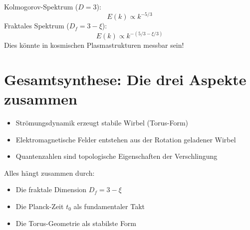 \documentclass[12pt,a4paper]{article}
\begin{document}
	Kolmogorov-Spektrum (\( D = 3 \)):
	\[
	E(k) \propto k^{-5/3}
	\]
	Fraktales Spektrum (\( D_f = 3 - \xi \)):
	\[
	E(k) \propto k^{-(5/3 - \xi/3)}
	\]
	Dies könnte in kosmischen Plasmastrukturen messbar sein!
	
	\section{Gesamtsynthese: Die drei Aspekte zusammen}
	\begin{itemize}
		\item Strömungsdynamik erzeugt stabile Wirbel (Torus-Form)
		\item Elektromagnetische Felder entstehen aus der Rotation geladener Wirbel
		\item Quantenzahlen sind topologische Eigenschaften der Verschlingung
	\end{itemize}
	
	Alles hängt zusammen durch:
	\begin{itemize}
		\item Die fraktale Dimension \( D_f = 3 - \xi \)
		\item Die Planck-Zeit \( t_0 \) als fundamentaler Takt
		\item Die Torus-Geometrie als stabilste Form
	\end{itemize}
\end{document}

